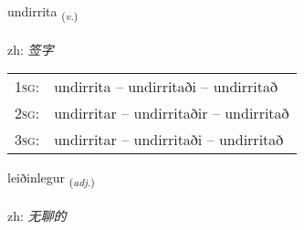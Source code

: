 \documentclass[frontgrid, backgrid]{flacards}\usepackage[]{graphicx}\usepackage[]{color}
\begin{document}
\renewcommand{\flhead}{\vskip5pt \fboxsep=0pt {\small\bfseries\footnotesize Sagnorð | 动词}}
\renewcommand{\fcfoot}{\vskip5pt \fboxsep=0pt \hspace{2pt}{\small\bfseries\footnotesize 2K}}

\renewcommand{\blhead}{\vskip5pt {\small\bfseries\footnotesize Sagnorð | 动词 }}
\renewcommand{\bcfoot}{\vskip5pt \hspace{2pt}{\small\bfseries\footnotesize 2K}}


{undirrita \small{\textsubscript{(\textit{v.})}} \\[1ex] %
\textphonetic{[ʏntɪrɪta]} \\
zh: \emph{签字} \\  [2ex]
\renewcommand*{\arraystretch}{0.8}
\begin{tabular}{p{1cm}l}
\textsc{1sg}: & undirrita -- undirritaði -- undirritað \\ 
\textsc{2sg}: & undirritar -- undirritaðir -- undirritað \\ 
\textsc{3sg}: & undirritar -- undirritaði -- undirritað \\ 
\end{tabular}
}

\renewcommand{\flhead}{\vskip5pt \fboxsep=0pt {\small\bfseries\footnotesize Lýsingarorð | 形容词}}
\renewcommand{\fcfoot}{\vskip5pt \fboxsep=0pt \hspace{2pt}{\small\bfseries\footnotesize 2K}}

\renewcommand{\blhead}{\vskip5pt {\small\bfseries\footnotesize Lýsingarorð | 形容词 }}
\renewcommand{\bcfoot}{\vskip5pt \hspace{2pt}{\small\bfseries\footnotesize 2K}}


{leiðinlegur \small{\textsubscript{(\textit{adj.})}} \\[1ex] %
\textphonetic{[leiːðɪnlɛɣʏr]} \\
zh: \emph{无聊的} \\  [2ex]
\renewcommand*{\arraystretch}{0.8}
}
\end{document}
